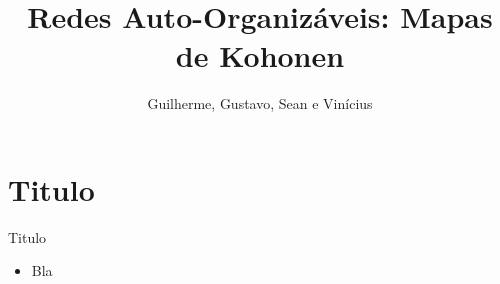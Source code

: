\documentclass{beamer}
\title{Redes Auto-Organizáveis: Mapas de Kohonen}
\author{Guilherme, Gustavo, Sean e Vinícius}
\institute{Universidade Estadual de Londrina}
\begin{document}
\frame{\titlepage}



\section{Titulo}

\begin{frame}{Titulo}

	\begin{itemize}
	  \item Bla
	\end{itemize}
\end{frame}
\end{document}
